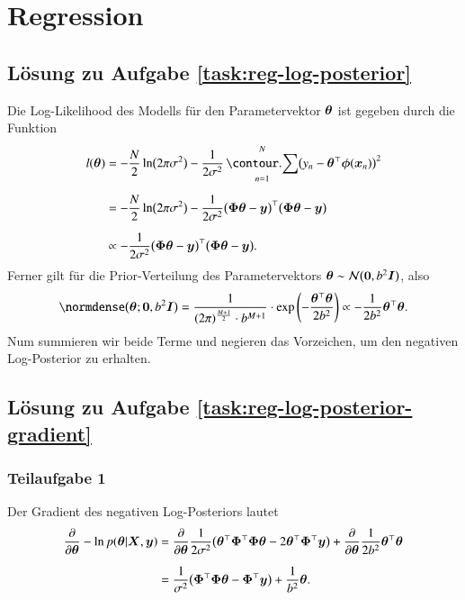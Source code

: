 \section{Regression}

\subsection*{Lösung zu Aufgabe \ref{task:reg-log-posterior}}

Die Log-Likelihood des Modells für den Parametervektor $\bm{\theta}$ ist gegeben durch die Funktion
\begin{align*}
	l(\btheta)
		&= -\frac{N}{2} \ln\bigl( 2 \pi \sigma^2 \bigr) - \frac{1}{2 \sigma^2} \sum_{n=1}^N \bigl( y_n - \btheta^\top \bphi(\bx_n) \bigr)^2
\\[2mm]
		&= -\frac{N}{2} \ln\bigl( 2 \pi \sigma^2 \bigr) - \frac{1}{2 \sigma^2} \bigl( \bPhi \btheta - \by \bigr)^\top \bigl( \bPhi \btheta - \by \bigr)
		\\[2mm]
		&\propto - \frac{1}{2 \sigma^2} \bigl( \bPhi \btheta - \by \bigr)^\top \bigl( \bPhi \btheta - \by \bigr).
\end{align*}
Ferner gilt für die Prior-Verteilung des Parametervektors $\bm{\theta} \sim \mathcal{N}\bigl( \bm{0}, b^2 \bm{I} \bigr)$, also
\begin{equation*}
	\normdense\bigl( \btheta; \0, b^2 \bI \bigr)
		= \frac{1}{(2 \pi)^{\frac{M+1}{2}} \cdot b^{M+1}} \cdot \exp\left( -\frac{\btheta^\top \btheta}{2 b^2} \right)
		\propto -\frac{1}{2 b^2} \btheta^\top \btheta.
\end{equation*}
Num summieren wir beide Terme und negieren das Vorzeichen, um den negativen Log-Posterior zu erhalten.


\subsection*{Lösung zu Aufgabe \ref{task:reg-log-posterior-gradient}}

\subsubsection*{Teilaufgabe 1}

Der Gradient des negativen Log-Posteriors lautet
\begin{align*}
	\frac{\partial}{\partial \bm{\theta}} -\ln p(\bm{\theta} \vert \bm{X}, \bm{y})
		&= \frac{\partial}{\partial \bm{\theta}} \frac{1}{2 \sigma^2} \bigl(
			\bm{\theta}^\top \bm{\Phi}^\top \bm{\Phi} \bm{\theta} - 2 \bm{\theta}^\top \bm{\Phi}^\top \bm{y}
		\bigr) + \frac{\partial}{\partial \bm{\theta}} \frac{1}{2 b^2} \bm{\theta}^\top \bm{\theta}
\\[2mm]
		&= \frac{1}{\sigma^2}\bigl( \bm{\Phi}^\top \bm{\Phi} \bm{\theta} - \bm{\Phi}^\top \bm{y} \bigr) + \frac{1}{b^2} \bm{\theta}.
\end{align*}

